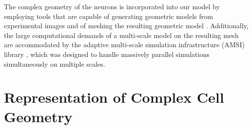 \documentclass[]{interact}
\begin{document}
The complex geometry of the neurons is incorporated into our model by employing tools \citep{simmetrix} that are capable of generating geometric models from experimental images \citep{Klaas_conference, Klaas:2013ug} and of meshing the resulting geometric model \citep{Shephard:2000vc}. Additionally, the large computational demands of a multi-scale model on the resulting mesh are accommodated by the adaptive multi-scale simulation infrastructure (AMSI) library \citep{Delalondre:2010kt,Tobin:2017ip}, which was designed to handle massively parallel simulations simultaneously on multiple scales.

\section{Representation of Complex Cell Geometry}
\end{document}
